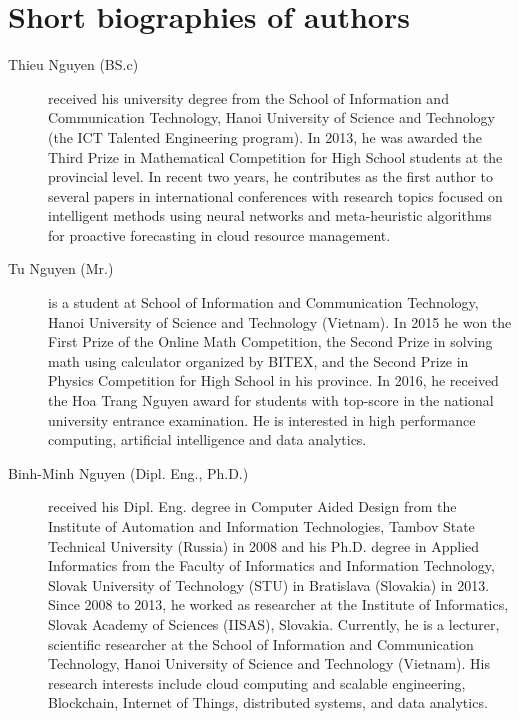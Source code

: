 \documentclass[smallextended,natbib]{svjour3}       %
\begin{document}
\section*{Short biographies of authors}
\begin{description}

\item[Thieu Nguyen (BS.c)]				%
received his university degree from the School of Information and Communication Technology, Hanoi University of Science and Technology (the ICT Talented Engineering program). In 2013, he was awarded the Third Prize in Mathematical Competition for High School students at the provincial level. In recent two years, he contributes as the first author to several papers in international conferences with research topics focused on intelligent methods using neural networks and meta-heuristic algorithms for proactive forecasting in cloud resource management. 


\item[Tu Nguyen (Mr.)]						%
is a student at School of Information and Communication Technology, Hanoi University of Science and Technology (Vietnam). In 2015 he won the First Prize of the Online Math Competition, the Second Prize in solving math using calculator organized by BITEX, and the Second Prize in Physics Competition for High School in his province. In 2016, he received the Hoa Trang Nguyen award for students with top-score in the national university entrance examination. He is interested in high performance computing, artificial intelligence and data analytics. 


\item [Binh-Minh Nguyen (Dipl. Eng., Ph.D.)] 	%
received his Dipl. Eng. degree in Computer Aided Design from the Institute of Automation and Information Technologies, Tambov State Technical University (Russia) in 2008 and his Ph.D. degree in Applied Informatics from the Faculty of Informatics and Information Technology, Slovak University of Technology (STU) in Bratislava (Slovakia) in 2013. Since 2008 to 2013, he worked as researcher at the Institute of Informatics, Slovak Academy of Sciences (IISAS), Slovakia. Currently, he is a lecturer, scientific researcher at the School of Information and Communication Technology, Hanoi University of Science and Technology (Vietnam). His research interests include cloud computing and scalable engineering, Blockchain, Internet of Things, distributed systems, and data analytics.



\end{description}
\end{document}
